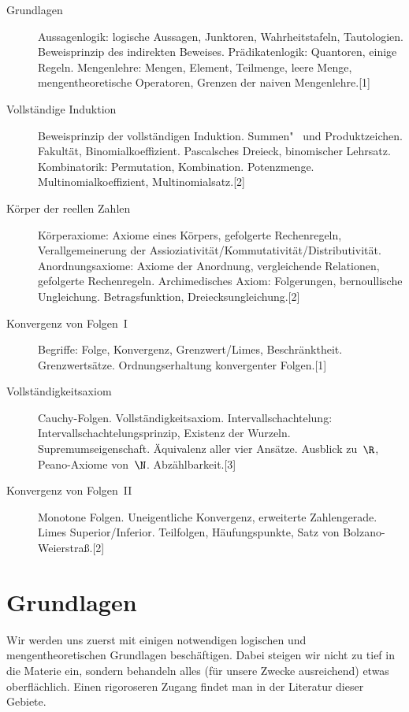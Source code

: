 \documentclass[a4paper]{article}
\begin{document}
\begin{description}
    \item[Grundlagen] Aussagenlogik: logische Aussagen, Junktoren, Wahrheitstafeln, Tautologien. Beweisprinzip des indirekten Beweises. Prädikatenlogik: Quantoren, einige Regeln. Mengenlehre: Mengen, Element, Teilmenge, leere Menge, mengentheoretische Operatoren, Grenzen der naiven Mengenlehre.\hspace*{\fill}[1]
    \item[Vollständige Induktion] Beweisprinzip der vollständigen Induktion. Summen"~ und Produktzeichen. Fakultät, Binomialkoeffizient. Pascalsches Dreieck, binomischer Lehrsatz. Kombinatorik: Permutation, Kombination. Potenzmenge. Multinomialkoeffizient, Multinomialsatz.\hspace*{\fill}[2]
    \item[Körper der reellen Zahlen] Körperaxiome: Axiome eines Körpers, gefolgerte Rechenregeln, Verallgemeinerung der Assioziativität/Kommutativität/Distributivität. Anordnungsaxiome: Axiome der Anordnung, vergleichende Relationen, gefolgerte Rechenregeln. Archimedisches Axiom: Folgerungen, bernoullische Ungleichung. Betragsfunktion, Dreiecksungleichung.\hspace*{\fill}[2]
    \item[Konvergenz von Folgen~I] Begriffe: Folge, Konvergenz, Grenzwert/Limes, Beschränktheit. Grenzwertsätze. Ordnungserhaltung konvergenter Folgen.\hspace*{\fill}[1]
    \item[Vollständigkeitsaxiom] Cauchy-Folgen. Vollständigkeitsaxiom. Intervallschachtelung: Intervallschachtelungsprinzip, Existenz der Wurzeln. Supremumseigenschaft. Äquivalenz aller vier Ansätze. Ausblick zu~$\R$, Peano-Axiome von~$\N$. Abzählbarkeit.\hspace*{\fill}[3]
    \item[Konvergenz von Folgen~II] Monotone Folgen. Uneigentliche Konvergenz, erweiterte Zahlengerade. Limes Superior/Inferior. Teilfolgen, Häufungspunkte, Satz von Bolzano-Weierstraß.\hspace*{\fill}[2]
\end{description}

\newpage\tableofcontents

\section{Grundlagen}

Wir werden uns zuerst mit einigen notwendigen logischen und mengentheoretischen Grundlagen beschäftigen. Dabei steigen wir nicht zu tief in die Materie ein, sondern behandeln alles (für unsere Zwecke ausreichend) etwas oberflächlich. Einen rigoroseren Zugang findet man in der Literatur dieser Gebiete.
\end{document}
